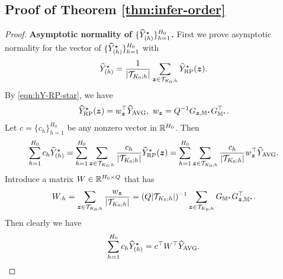 \documentclass[12pt]{article}
\begin{document}
\subsection{Proof of Theorem \ref{thm:infer-order}}
\begin{proof}
\textbf{Asymptotic normality of $\{{\widehat{Y}}^\star_{(h)}\}_{h=1}^{H_0}$.}
    First we prove asymptotic normality for the vector of $\{{\widehat{Y}}^\star_{(h)}\}_{h=1}^{H_0}$ with
    \begin{align*}
        {\widehat{Y}}^\star_{(h)} = \frac{1}{|{{\mathcal{T}}}_{K_0;h}|} \sum_{{\boldsymbol{z}}\in {{\mathcal{T}}}_{K_0;h}} {\widehat{Y}}^\star_{\operatorname{RP}}({\boldsymbol{z}}).
    \end{align*}
    By \eqref{eqn:hY-RP-star}, we have
    \begin{align*}
        {\widehat{Y}}^\star_{\operatorname{RP}}({\boldsymbol{z}}) = w_{{\boldsymbol{z}}}^\top {\widehat{Y}}_{\operatorname{AVG}}, ~w_{{\boldsymbol{z}}} = Q^{-1}G_{{\boldsymbol{z}}, {\mathbb{M}}^\star} G_{{\mathbb{M}}^\star}^\top.
    \end{align*}
    Let $c = \{c_h\}_{h=1}^{H_0}$ be any nonzero vector in ${\mathbb{R}}^{H_0}$. Then
    \begin{align*}
        \sum_{h=1}^{H_0} c_h {\widehat{Y}}^\star_{(h)} = \sum_{h=1}^{H_0} \sum_{{\boldsymbol{z}}\in {{\mathcal{T}}}_{K_0;h}} \frac{c_h}{|{{\mathcal{T}}}_{K_0;h}|}{\widehat{Y}}^\star_{\operatorname{RP}}({\boldsymbol{z}}) = \sum_{h=1}^{H_0} \sum_{{\boldsymbol{z}}\in {{\mathcal{T}}}_{K_0;h}} \frac{c_h}{|{{\mathcal{T}}}_{K_0;h}|}w_{{\boldsymbol{z}}}^\top {\widehat{Y}}_{\operatorname{AVG}}.
    \end{align*}
    Introduce a matrix $W \in{\mathbb{R}}^{H_0 \times Q}$ that has
    \begin{align*}
        W_{\cdot h} = \sum_{{\boldsymbol{z}}\in {{\mathcal{T}}}_{K_0;h}}\frac{w_{{\boldsymbol{z}}}}{|{{\mathcal{T}}}_{K_0;h}|} = (Q|{{\mathcal{T}}}_{K_0;h}|)^{-1}\sum_{{\boldsymbol{z}}\in {{\mathcal{T}}}_{K_0;h}}G_{{\mathbb{M}}^\star} G_{{\boldsymbol{z}}, {\mathbb{M}}^\star}^\top .
    \end{align*}
    Then clearly we have
    \begin{align*}
        \sum_{h=1}^{H_0} c_h {\widehat{Y}}^\star_{(h)} = c^\top W^\top {\widehat{Y}}_{\operatorname{AVG}}.
    \end{align*}
    

\end{proof}
\end{document}
